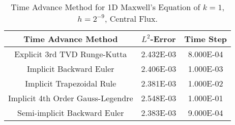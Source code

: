 \documentclass[a4paper]{article}
\begin{document}
\begin{table}
\caption{Time Advance Method for 1D Maxwell's Equation of $k=1$, $h=2^{-9}$, Central Flux.}\vspace{5pt}
\centering
\begin{tabular}{c|c|c}\toprule\hline
Time Advance Method & $L^2$-Error & Time Step \\ \hline
Explicit 3rd TVD Runge-Kutta  & 2.432E-03 & 8.000E-04\\ %
Implicit Backward Euler & 2.406E-03 & 1.000E-03\\ %
Implicit Trapezoidal Rule & 2.381E-03 & 1.000E-02\\ %
Implicit 4th Order Gauss-Legendre& 2.548E-03 &1.000E-01\\
Semi-implicit Backward Euler & 2.383E-03 & 9.000E-04\\ \hline
\bottomrule
\end{tabular}
\end{table}


\end{document}
